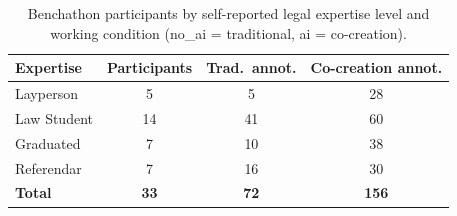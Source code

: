 \begin{table}[t]
\centering\footnotesize
\caption{Benchathon participants by self-reported legal expertise level and working condition (no\_ai = traditional, ai = co-creation).}
\label{tbl-human-participants}
\setlength{\tabcolsep}{4pt}
\begin{tabular*}{\textwidth}{@{\extracolsep{\fill}}lccc@{}}
\toprule
Expertise & Participants & Trad.~annot. & Co-creation annot. \\
\midrule
Layperson & 5 & 5 & 28 \\
Law Student & 14 & 41 & 60 \\
Graduated & 7 & 10 & 38 \\
Referendar & 7 & 16 & 30 \\
\textbf{Total} & \textbf{33} & \textbf{72} & \textbf{156} \\
\bottomrule
\end{tabular*}
\end{table}
